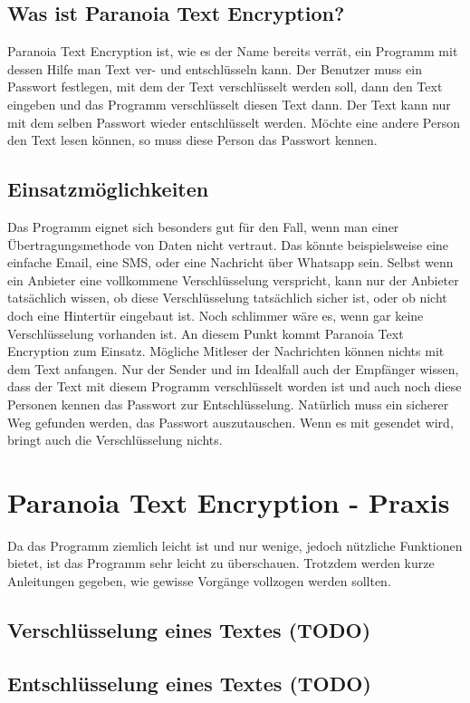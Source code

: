 \documentclass[12pt,a4paper]{scrreprt}
\begin{document}
\section{Was ist Paranoia Text Encryption?}
Paranoia Text Encryption ist, wie es der Name bereits verrät, ein Programm mit dessen Hilfe man Text ver- und entschlüsseln kann. Der Benutzer muss ein Passwort festlegen, mit dem der Text verschlüsselt werden soll, dann den Text eingeben und das Programm verschlüsselt diesen Text dann. Der Text kann nur mit dem selben Passwort wieder entschlüsselt werden. Möchte eine andere Person den Text lesen können, so muss diese Person das Passwort kennen.

\section{Einsatzmöglichkeiten}
Das Programm eignet sich besonders gut für den Fall, wenn man einer Übertragungsmethode von Daten nicht vertraut. Das könnte beispielsweise eine einfache Email, eine SMS, oder eine Nachricht über Whatsapp sein. Selbst wenn ein Anbieter eine vollkommene Verschlüsselung verspricht, kann nur der Anbieter tatsächlich wissen, ob diese Verschlüsselung tatsächlich sicher ist, oder ob nicht doch eine Hintertür eingebaut ist. Noch schlimmer wäre es, wenn gar keine Verschlüsselung vorhanden ist. An diesem Punkt kommt Paranoia Text Encryption zum Einsatz. Mögliche Mitleser der Nachrichten können nichts mit dem Text anfangen. Nur der Sender und im Idealfall auch der Empfänger wissen, dass der Text mit diesem Programm verschlüsselt worden ist und auch noch diese Personen kennen das Passwort zur Entschlüsselung. Natürlich muss ein sicherer Weg gefunden werden, das Passwort auszutauschen. Wenn es mit gesendet wird, bringt auch die Verschlüsselung nichts.

\chapter{Paranoia Text Encryption - Praxis}
Da das Programm ziemlich leicht ist und nur wenige, jedoch nützliche Funktionen bietet, ist das Programm sehr leicht zu überschauen. Trotzdem werden kurze Anleitungen gegeben, wie gewisse Vorgänge vollzogen werden sollten.

\section{Verschlüsselung eines Textes (TODO)}

\section{Entschlüsselung eines Textes (TODO)}
\end{document}
